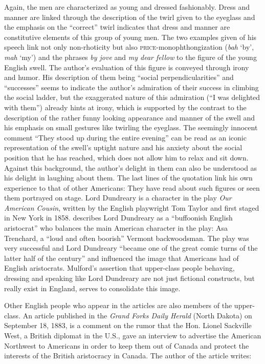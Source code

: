 Again, the men are characterized as young and dressed fashionably. Dress and manner are linked through the description of the twirl given to the eyeglass and the emphasis on the “correct” twirl indicates that dress and manner are constitutive elements of this group of young men. The two examples given of his speech link not only non-rhoticity but also \textsc{price}{}-monophthongization (\emph{bah} ‘by’, \emph{mah} ‘my’) and the phrases \emph{by jove} and \emph{my dear fellow} to the figure of the young English swell. The author’s evaluation of this figure is conveyed through irony and humor. His description of them being “social perpendicularities” and “successes” seems to indicate the author’s admiration of their success in climbing the social ladder, but the exaggerated nature of this admiration (“I was delighted with them”) already hints at irony, which is supported by the contrast to the description of the rather funny looking appearance and manner of the swell and his emphasis on small gestures like twirling the eyeglass. The seemingly innocent comment “They stood up during the entire evening” can be read as an iconic representation of the swell’s uptight nature and his anxiety about the social position that he has reached, which does not allow him to relax and sit down. Against this background, the author’s delight in them can also be understood as his delight in laughing about them. The last lines of the quotation link his own experience to that of other Americans: They have read about such figures or seen them portrayed on stage. Lord Dundreary is a character in the play \emph{Our American Cousin}, written by the English playwright Tom Taylor and first staged in New York in 1858. \citet[206]{Adams2012} describes Lord Dundreary as a “buffoonish English aristocrat” who balances the main American character in the play: Asa Trenchard, a “loud and often boorish” Vermont backwoodsman. The play was very successful and Lord Dundreary “became one of the great comic turns of the latter half of the century” \citep[206]{Adams2012} and influenced the image that Americans had of English aristocrats. Mulford’s assertion that upper-class people behaving, dressing and speaking like Lord Dundreary are not just fictional constructs, but really exist in England, serves to consolidate this image.


Other English people who appear in the articles are also members of the upper-class. An article published in the \emph{Grand Forks Daily Herald} (North Dakota) on September 18, 1883, is a comment on the rumor that the Hon. Lionel Sackville West, a British diplomat in the U.S., gave an interview to advertise the American Northwest to Americans in order to keep them out of Canada and protect the interests of the British aristocracy in Canada. The author of the article writes:


